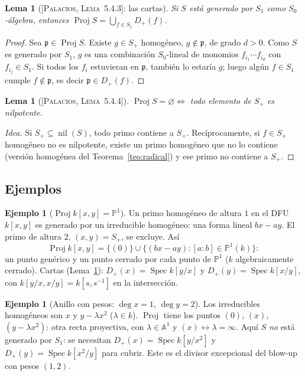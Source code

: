 \documentclass[11pt,a4paper]{article}
\newcommand{\Spec}{\operatorname{Spec}}
\newcommand{\Proj}{\operatorname{Proj}}
\newcommand{\nil}{\operatorname{nil}}
\newcommand{\A}{\mathbb{A}}
\newcommand{\PP}{\mathbb{P}}
\newcommand{\pp}{\mathfrak{p}}
\theoremstyle{plain}
\newtheorem{lema}[teorema]{Lema}
\theoremstyle{definition}
\newtheorem{ejemplo}[teorema]{Ejemplo}
\theoremstyle{remark}
\newcounter{ej}
\newcommand{\libro}[1]{\textsc{[Palacios, #1]}}
\begin{document}
\begin{lema}[{\libro{Lema~5.4.3}: las cartas}]\label{lema:cartas}
Si $S$ está generado por $S_1$ como $S_0$-álgebra, entonces $\Proj S=\bigcup_{f\in S_1}D_+(f)$.
\end{lema}
\begin{proof}
Sea $\pp\in\Proj S$. Existe $g\in S_+$ homogéneo, $g\notin\pp$, de grado $d>0$. Como $S$ es generado por $S_1$, $g$ es una combinación $S_0$-lineal de monomios $f_{i_1}\cdots f_{i_d}$ con $f_{i_j}\in S_1$. Si todos los $f_i$ estuvieran en $\pp$, también lo estaría $g$; luego algún $f\in S_1$ cumple $f\notin\pp$, es decir $\pp\in D_+(f)$.
\end{proof}

\begin{lema}[{\libro{Lema~5.4.4}}]
$\Proj S=\varnothing\iff$ todo elemento de $S_+$ es nilpotente.
\end{lema}
\begin{proof}[Idea]
Si $S_+\subseteq\nil(S)$, todo primo contiene a $S_+$. Recíprocamente, si $f\in S_+$ homogéneo no es nilpotente, existe un primo homogéneo que no lo contiene (versión homogénea del Teorema~\ref{teo:radical}) y ese primo no contiene a $S_+$.
\end{proof}

\subsection{Ejemplos}

\begin{ejemplo}[{$\Proj k[x,y]=\PP^1$}]\label{ej:p1}
Un primo homogéneo de altura $1$ en el DFU $k[x,y]$ es generado por un irreducible homogéneo: una forma lineal $bx-ay$. El primo de altura $2$, $(x,y)=S_+$, se excluye. Así
\[
\Proj k[x,y]=\{(0)\}\cup\{(bx-ay):[a:b]\in\PP^1(k)\}:
\]
un punto genérico y un punto cerrado por cada punto de $\PP^1$ ($k$ algebraicamente cerrado). Cartas (Lema~\ref{lema:cartas}): $D_+(x)=\Spec k[y/x]$ y $D_+(y)=\Spec k[x/y]$, con $k[y/x,x/y]=k[s,s^{-1}]$ en la intersección.
\end{ejemplo}

\begin{ejemplo}[{Anillo con pesos: $\deg x=1$, $\deg y=2$}]\label{ej:pesos}
Los irreducibles homogéneos son $x$ y $y-\lambda x^2$ ($\lambda\in k$). $\Proj$ tiene los puntos $(0)$, $(x)$, $(y-\lambda x^2)$: otra recta proyectiva, con $\lambda\in\A^1$ y $(x)\leftrightarrow\lambda=\infty$. Aquí $S$ \emph{no} está generado por $S_1$: se necesitan $D_+(x)=\Spec k[y/x^2]$ y $D_+(y)=\Spec k[x^2/y]$ para cubrir. Este es el divisor excepcional del blow-up con pesos $(1,2)$.
\end{ejemplo}
\end{document}
